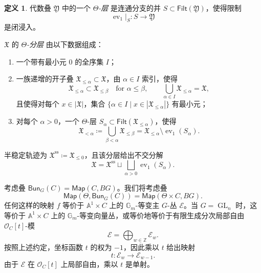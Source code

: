 \documentclass{amsart}
\theoremstyle{definition}
\newtheorem{defn}[thm]{定义}
\theoremstyle{remark}
\theoremstyle{plain}
\theoremstyle{definition}
\theoremstyle{remark}
\newcommand{\A}{\mathbb{A}}
\newcommand{\G}{\mathbb{G}}
\newcommand{\Z}{\mathbb{Z}}
\newcommand{\mc}[1]{\mathcal{#1}}
\newcommand{\mf}[1]{\mathfrak{#1}}
\newcommand{\mr}[1]{\mathrm{#1}}
\newcommand{\on}[1]{\operatorname{#1}}
\newcommand{\ms}[1]{\mathsf{#1}}
\newcommand{\1}{\mathbf{1}}
\newcommand{\2}{\mathbf{2}}
\newcommand{\3}{\mathbf{3}}
\DeclareMathOperator{\ev}{ev}
\begin{document}
\begin{defn}
    代数叠 \(\mf{Y}\) 中的一个 \textit{\(\Theta\)-层} 是连通分支的并 \(S\subset\ms{Filt}(\mf{Y})\)，使得限制
    \[
        \ev_1|_S\colon S\longrightarrow\mf{Y}
    \]
    是闭浸入。

    \(\mf{X}\) 的 \textit{\(\Theta\)-分层} 由以下数据组成：
    \begin{enumerate}
        \item 一个带有最小元 \(0\) 的全序集 \(I\)；
        \item 一族递增的开子叠 \(\mf{X}_{\leq\alpha}\subset\mf{X}\)，由 \(\alpha\in I\) 索引，使得
        \[
            \mf{X}_{\leq\alpha}\subset\mf{X}_{\leq\beta}
            \quad\text{for }\alpha\leq\beta,
            \qquad
            \bigcup_{\alpha\in I}\mf{X}_{\leq\alpha}=\mf{X},
        \]
        且使得对每个 \(x\in|\mf{X}|\)，集合 \(\{\alpha\in I\mid x\in|\mf{X}_{\leq\alpha}|\}\) 有最小元；
        \item 对每个 \(\alpha>0\)，一个 \(\Theta\)-层 \(S_\alpha\subset\ms{Filt}(\mf{X}_{\leq\alpha})\)，使得
        \[
            \mf{X}_{<\alpha}
            \coloneqq
            \bigcup_{\beta<\alpha}\mf{X}_{\leq\beta}
            =
            \mf{X}_{\leq\alpha}\setminus\ev_1(S_\alpha).
        \]
    \end{enumerate}
    半稳定轨迹为 \(\mf{X}^{\mr{ss}}\coloneqq\mf{X}_{\leq0}\)，且该分层给出不交分解
    \[
        \mf{X}
        =
        \mf{X}^{\mr{ss}}
        \sqcup
        \bigsqcup_{\alpha>0}\ev_1(S_\alpha).
    \]
\end{defn}

考虑叠 \(\ms{Bun}_G(C) = \ms{Map}(C, BG)\)。我们将考虑叠
\[ \ms{Map}(\Theta, \ms{Bun}_G(C)) = \ms{Map}(\Theta \times C, BG). \]
任何这样的映射 \(f\) 等价于 \(\A^1\times C\) 上的 \(\G_m\)-等变主 \(G\)-丛 \(\mc{E}\)。当 \(G=\on{GL}_n\) 时，这等价于 \(\A^1\times C\) 上的 \(\G_m\)-等变向量丛，或等价地等价于有限生成分次局部自由 \(\mc{O}_C[t]\)-模
\[
    \mc{E}=\bigoplus_{w\in\Z}\mc{E}_w.
\]
按照上述约定，坐标函数 \(t\) 的权为 \(-1\)，因此乘以 \(t\) 给出映射
\[
    t\colon\mc{E}_w\longrightarrow\mc{E}_{w-1}.
\]
由于 \(\mc{E}\) 在 \(\mc{O}_C[t]\) 上局部自由，乘以 \(t\) 是单射。
\end{document}
